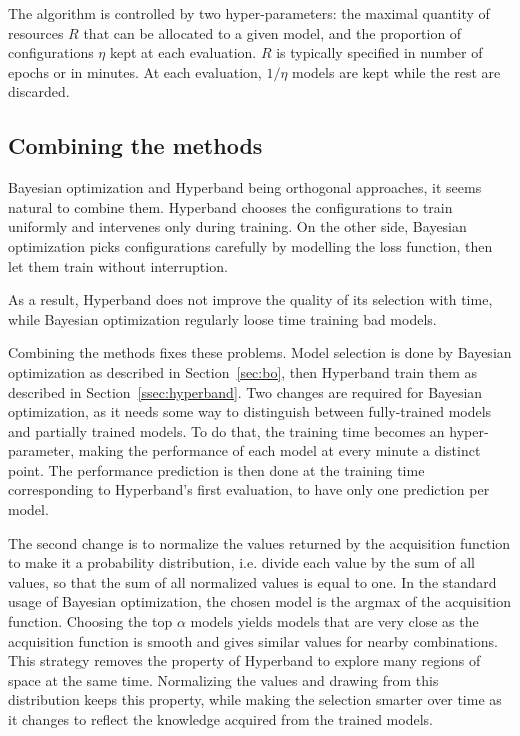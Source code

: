 The algorithm is controlled by two hyper-parameters: the maximal quantity of resources $R$ that can be allocated to a given model, and the proportion of configurations $\eta$ kept at each evaluation. $R$ is typically specified in number of epochs or in minutes. At each evaluation, $1 / \eta$ models are kept while the rest are discarded. 

\subsection{Combining the methods}

Bayesian optimization and Hyperband being orthogonal approaches, it seems natural to combine them. Hyperband chooses the configurations to train uniformly and intervenes only during training. On the other side, Bayesian optimization picks configurations carefully by modelling the loss function, then let them train without interruption.

As a result, Hyperband does not improve the quality of its selection with time, while Bayesian optimization regularly loose time training bad models.

Combining the methods fixes these problems. Model selection is done by Bayesian optimization as described in Section~\ref{sec:bo}, then Hyperband train them as described in Section~\ref{ssec:hyperband}. Two changes are required for Bayesian optimization, as it needs some way to distinguish between fully-trained models and partially trained models. To do that, the training time becomes an hyper-parameter, making the performance of each model at every minute a distinct point. The performance prediction is then done at the training time corresponding to Hyperband's first evaluation, to have only one prediction per model.

The second change is to normalize the values returned by the acquisition function to make it a probability distribution, i.e. divide each value by the sum of all values, so that the sum of all normalized values is equal to one. In the standard usage of Bayesian optimization, the chosen model is the argmax of the acquisition function. Choosing the top $\alpha$ models yields models that are very close as the acquisition function is smooth and gives similar values for nearby combinations. This strategy removes the property of Hyperband to explore many regions of space at the same time. Normalizing the values and drawing from this distribution keeps this property, while making the selection smarter over time as it changes to reflect the knowledge acquired from the trained models.

